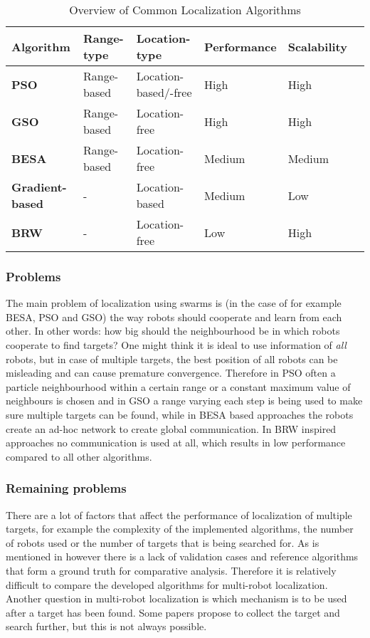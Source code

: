 	\begin{table}[H]
  \renewcommand{\arraystretch}{1.3}
  \caption{Overview of Common Localization Algorithms}
  \label{table_alg_localization}
  \centering
    \begin{tabular}{|l|l|l|l|l|l|}
    \hline
    \bfseries Algorithm & Range-type & Location-type & Performance & Scalability\\
    \hline
    \bfseries PSO & Range-based & Location-based/-free & High & High\\
    \hline
    \bfseries GSO & Range-based & Location-free & High & High\\
    \hline
    \bfseries BESA & Range-based & Location-free & Medium & Medium\\
    \hline
    \bfseries Gradient-based & - & Location-based & Medium & Low\\
    \hline
    \bfseries BRW & - & Location-free & Low & High\\
    \hline
    \end{tabular}
  \end{table}

	\subsubsection{Problems}
	The main problem of localization using swarms is (in the case of for example BESA, PSO and GSO) the way robots should cooperate and learn from each other. In other words: how big should the neighbourhood be in which robots cooperate to find targets? One might think it is ideal to use information of \emph{all} robots, but in case of multiple targets, the best position of all robots can be misleading and can cause premature convergence. Therefore in PSO often a particle neighbourhood within a certain range or a constant maximum value of neighbours is chosen and in GSO a range varying each step is being used to make sure multiple targets can be found, while in BESA based approaches the robots create an ad-hoc network to create global communication. In BRW inspired approaches no communication is used at all, which results in low performance compared to all other algorithms.


	\subsubsection{Remaining problems}
	There are a lot of factors that affect the performance of localization of multiple targets, for example the complexity of the implemented algorithms, the number of robots used or the number of targets that is being searched for. As is mentioned in \cite{mcgill2011robot} however there is a lack of validation cases and reference algorithms that form a ground truth for comparative analysis. Therefore it is relatively difficult to compare the developed algorithms for multi-robot localization. Another question in multi-robot localization is which mechanism is to be used after a target has been found. Some papers propose to collect the target and search further, but this is not always possible.